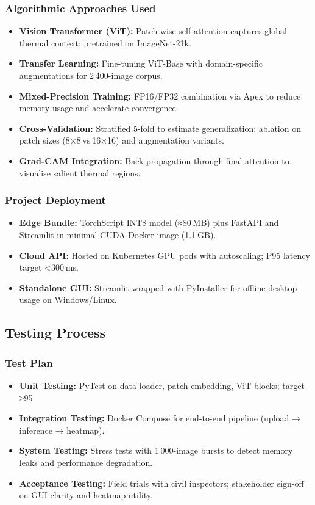 \subsubsection{Algorithmic Approaches Used}

\begin{itemize}
    \item \textbf{Vision Transformer (ViT):} Patch-wise self-attention captures global thermal context; pretrained on ImageNet-21k.
    \item \textbf{Transfer Learning:} Fine-tuning ViT-Base with domain-specific augmentations for 2 400-image corpus.
    \item \textbf{Mixed-Precision Training:} FP16/FP32 combination via Apex to reduce memory usage and accelerate convergence.
    \item \textbf{Cross-Validation:} Stratified 5-fold to estimate generalization; ablation on patch sizes (8×8 vs 16×16) and augmentation variants.
    \item \textbf{Grad-CAM Integration:} Back-propagation through final attention to visualise salient thermal regions.
\end{itemize}

\subsubsection{Project Deployment}

\begin{itemize}
    \item \textbf{Edge Bundle:} TorchScript INT8 model (≈80 MB) plus FastAPI and Streamlit in minimal CUDA Docker image (1.1 GB).
    \item \textbf{Cloud API:} Hosted on Kubernetes GPU pods with autoscaling; P95 latency target <300 ms.
    \item \textbf{Standalone GUI:} Streamlit wrapped with PyInstaller for offline desktop usage on Windows/Linux.
\end{itemize}


\subsection{Testing Process}

\subsubsection{Test Plan}
\begin{itemize}
    \item \textbf{Unit Testing:} PyTest on data‐loader, patch embedding, ViT blocks; target ≥95 %
    \item \textbf{Integration Testing:} Docker Compose for end-to-end pipeline (upload → inference → heatmap).
    \item \textbf{System Testing:} Stress tests with 1 000-image bursts to detect memory leaks and performance degradation.
    \item \textbf{Acceptance Testing:} Field trials with civil inspectors; stakeholder sign-off on GUI clarity and heatmap utility.
\end{itemize}

